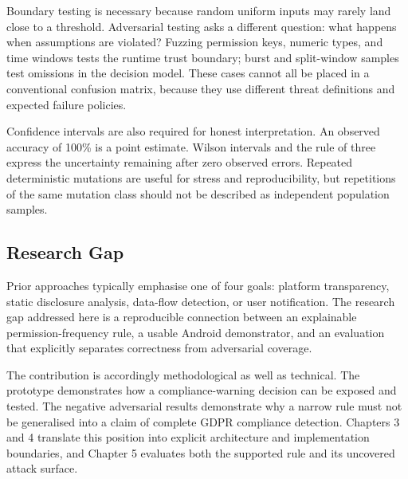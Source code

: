 Boundary testing is necessary because random uniform inputs may rarely land close to a threshold. Adversarial testing asks a different question: what happens when assumptions are violated? Fuzzing permission keys, numeric types, and time windows tests the runtime trust boundary; burst and split-window samples test omissions in the decision model. These cases cannot all be placed in a conventional confusion matrix, because they use different threat definitions and expected failure policies.

Confidence intervals are also required for honest interpretation. An observed accuracy of 100\% is a point estimate. Wilson intervals and the rule of three express the uncertainty remaining after zero observed errors. Repeated deterministic mutations are useful for stress and reproducibility, but repetitions of the same mutation class should not be described as independent population samples.

\subsection{Research Gap}

Prior approaches typically emphasise one of four goals: platform transparency, static disclosure analysis, data-flow detection, or user notification. The research gap addressed here is a reproducible connection between an explainable permission-frequency rule, a usable Android demonstrator, and an evaluation that explicitly separates correctness from adversarial coverage.

The contribution is accordingly methodological as well as technical. The prototype demonstrates how a compliance-warning decision can be exposed and tested. The negative adversarial results demonstrate why a narrow rule must not be generalised into a claim of complete GDPR compliance detection. Chapters 3 and 4 translate this position into explicit architecture and implementation boundaries, and Chapter 5 evaluates both the supported rule and its uncovered attack surface.
